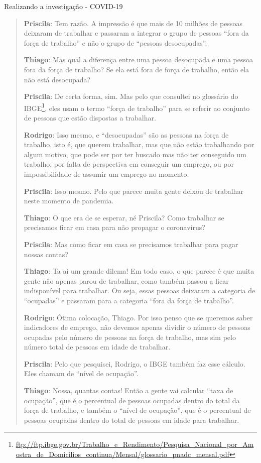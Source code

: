 \begin{example}{Realizando a investigação - COVID-19}
\begin{quote}
\textbf{Priscila}: Tem razão. A impressão é que mais de 10 milhões de pessoas deixaram de trabalhar e passaram a integrar o grupo de pessoas “fora da força de trabalho”{} e não o grupo de “pessoas desocupadas”.

\textbf{Thiago}: Mas qual a diferença entre uma pessoa desocupada e uma pessoa fora da força de trabalho? Se ela está fora de força de trabalho, então ela não está desocupada?

\textbf{Priscila}: De certa forma, sim. Mas pelo que consultei no glossário do IBGE\footnote{\url{ftp://ftp.ibge.gov.br/Trabalho_e_Rendimento/Pesquisa_Nacional_por_Amostra_de_Domicilios_continua/Mensal/glossario_pnadc_mensal.pdf}}, eles usam o termo “força de trabalho” para se referir ao conjunto de pessoas que estão dispostas a trabalhar.

\textbf{Rodrigo}: Isso mesmo, e “desocupadas” são as pessoas na força de trabalho, isto é, que querem trabalhar, mas que não estão trabalhando por algum motivo, que pode ser por ter buscado mas não ter conseguido um trabalho, por falta de perspectiva em conseguir um emprego, ou por impossibilidade de assumir um emprego no momento.

\textbf{Priscila}: Isso mesmo. Pelo que parece muita gente deixou de trabalhar neste momento de pandemia.

\textbf{Thiago}: O que era de se esperar, né Priscila? Como trabalhar se precisamos ficar em casa para não propagar o coronavírus?

\textbf{Priscila}: Mas como ficar em casa se precisamos trabalhar para pagar nossas contas?

\textbf{Thiago}: Ta aí um grande dilema! Em todo caso,  o que parece é que muita gente não apenas parou de trabalhar, como também passou a ficar indisponível para trabalhar. Ou seja, essas pessoas deixaram a categoria de “ocupadas” e passaram para a categoria “fora da força de trabalho”.

\textbf{Rodrigo}: Ótima colocação, Thiago. Por isso penso que se queremos saber indicadores de emprego, não devemos apenas dividir o número de pessoas ocupadas pelo número de pessoas na força de trabalho, mas sim pelo número total de pessoas em idade de trabalhar.

\textbf{Priscila}: Pelo que pesquisei, Rodrigo, o IBGE também faz esse cálculo. Eles chamam de “nível de ocupação”.

\textbf{Thiago}: Nossa, quantas contas! Então a gente vai calcular “taxa de ocupação”, que é o percentual de pessoas ocupadas dentro do total da força de trabalho, e também o “nível de ocupação”, que é o percentual de pessoas ocupadas dentro do total de pessoas em idade para trabalhar.


\end{quote}
\end{example}

